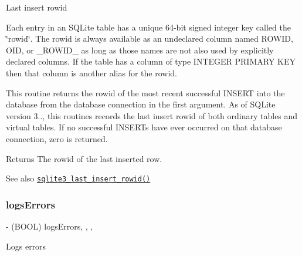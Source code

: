 Last insert rowid

Each entry in an S\+Q\+Lite table has a unique 64-\/bit signed integer key called the \char`\"{}rowid\char`\"{}. The rowid is always available as an undeclared column named {\ttfamily R\+O\+W\+ID}, {\ttfamily O\+ID}, or {\ttfamily \+\_\+\+R\+O\+W\+I\+D\+\_\+} as long as those names are not also used by explicitly declared columns. If the table has a column of type {\ttfamily I\+N\+T\+E\+G\+ER P\+R\+I\+M\+A\+RY K\+EY} then that column is another alias for the rowid.

This routine returns the rowid of the most recent successful {\ttfamily I\+N\+S\+E\+RT} into the database from the database connection in the first argument. As of S\+Q\+Lite version 3.., this routines records the last insert rowid of both ordinary tables and virtual tables. If no successful {\ttfamily I\+N\+S\+E\+RT}s have ever occurred on that database connection, zero is returned.

\begin{DoxyReturn}{Returns}
The rowid of the last inserted row.
\end{DoxyReturn}
\begin{DoxySeeAlso}{See also}
\href{http://sqlite.org/c3ref/last_insert_rowid.html}{\tt sqlite3\+\_\+last\+\_\+insert\+\_\+rowid()} 
\end{DoxySeeAlso}
\mbox{\label{interface_o_p_t_l_y_f_m_d_b_database_a80ce796b9a9582c2be9ce9563988c517}} 
\subsubsection{\texorpdfstring{logs\+Errors}{logsErrors}}
{\footnotesize\ttfamily -\/ (B\+O\+OL) logs\+Errors\hspace{0.3cm}{\ttfamily [read]}, {\ttfamily [write]}, {\ttfamily [atomic]}, {\ttfamily [assign]}}

Logs errors \mbox{\label{interface_o_p_t_l_y_f_m_d_b_database_a892d607f231db0ffb8b98bbf5d914f2d}} 
